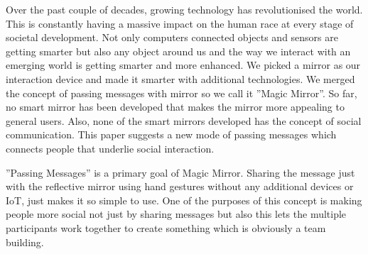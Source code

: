 \documentclass{sigchi-ext}
\begin{document}
Over the past couple of decades, growing technology has revolutionised the world. This is constantly having a massive impact on the human race at every stage of societal development. Not only computers connected objects and sensors are getting smarter but also any object around us and the way we interact with an emerging world is getting smarter and more enhanced. We picked a mirror as our interaction device and made it smarter with additional technologies. We merged the concept of passing messages with mirror so we call it ''Magic Mirror''. So far, no smart mirror has been developed that makes the mirror more appealing to general users. Also, none of the smart mirrors developed has the concept of social communication. This paper suggests a new mode of passing messages which connects people that underlie social interaction.

''Passing Messages'' is a primary goal of Magic Mirror. Sharing the message just with the reflective mirror using hand gestures without any additional devices or IoT, just makes it so simple to use. One of the purposes of this concept is making people more social not just by sharing messages but also this lets the multiple participants work together to create something which is obviously a team building.
\end{document}
